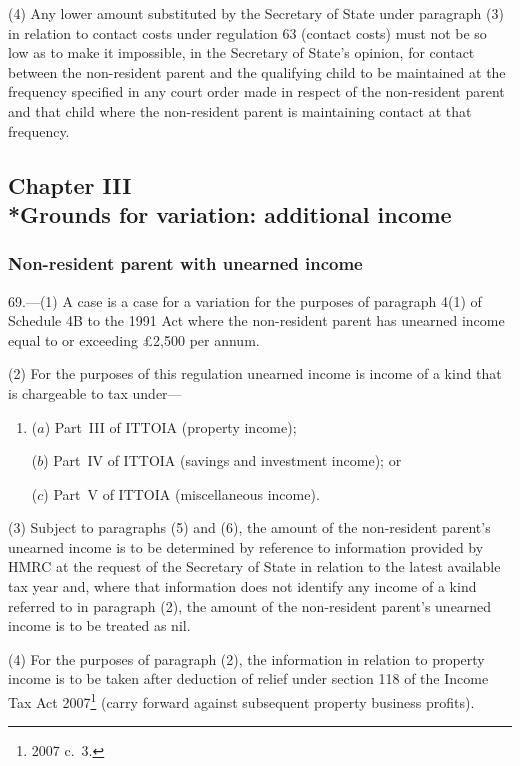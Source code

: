 \documentclass[12pt,a4paper]{article}
\begin{document}
(4) Any lower amount substituted by the Secretary of State under paragraph (3) in relation to contact costs under regulation 63 (contact costs) must not be so low as to make it impossible, in the Secretary of State’s opinion, for contact between the non-resident parent and the qualifying child to be maintained at the frequency specified in any court order made in respect of the non-resident parent and that child where the non-resident parent is maintaining contact at that frequency.

\subsection[Chapter III --- Grounds for variation: additional income]{Chapter III\\*Grounds for variation: additional income}

\renewcommand\parthead{--- Part V Chapter III}

\subsubsection[69. Non-resident parent with unearned income]{Non-resident parent with unearned income}

69.---(1)  A case is a case for a variation for the purposes of paragraph 4(1) of Schedule 4B to the 1991 Act where the non-resident parent has unearned income equal to or exceeding £2,500 per annum.

(2) For the purposes of this regulation unearned income is income of a kind that is chargeable to tax under—
\begin{enumerate}\item[]
($a$) Part~III of ITTOIA (property income);

($b$) Part~IV of ITTOIA (savings and investment income); or

($c$) Part~V of ITTOIA (miscellaneous income).
\end{enumerate}

(3) Subject to paragraphs (5) and (6), the amount of the non-resident parent’s unearned income is to be determined by reference to information provided by HMRC at the request of the Secretary of State in relation to the latest available tax year and, where that information does not identify any income of a kind referred to in paragraph (2), the amount of the non-resident parent’s unearned income is to be treated as nil.

(4) For the purposes of paragraph (2), the information in relation to property income is to be taken after deduction of relief under section 118 of the Income Tax Act 2007\footnote{2007 c.~3.} (carry forward against subsequent property business profits).
\end{document}
